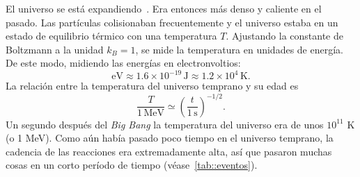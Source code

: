 El universo se está expandiendo~\cite{hubble1929relation}. Era entonces más denso y caliente en el pasado. Las partículas colisionaban frecuentemente y el universo estaba en un estado de equilibrio térmico con una temperatura \(T\). Ajustando la constante de Boltzmann a la unidad \(k_B=1\), se mide la temperatura en unidades de energía. De este modo, midiendo las energías en electronvoltios:
\begin{equation}
    \mathrm{eV}\approx 1.6\times 10^{-19}\,\mathrm{J}\approx 1.2\times 10^{4}\,\mathrm{K}.
\end{equation}
La relación entre la temperatura del universo temprano y su edad es~\cite{baumann2022cosmology}
\begin{equation}
    \frac{T}{1\,\mathrm{MeV}}\simeq \left(\frac{t}{1\,\mathrm{s}}\right)^{-1/2}.
\end{equation}
Un segundo después del \textit{Big Bang} la temperatura del universo era de unos \(10^{11}\) K (o 1 MeV). Como aún había pasado poco tiempo en el universo temprano, la cadencia de las reacciones era extremadamente alta, así que pasaron muchas cosas en un corto período de tiempo (véase~\autoref{tab::eventos}).
